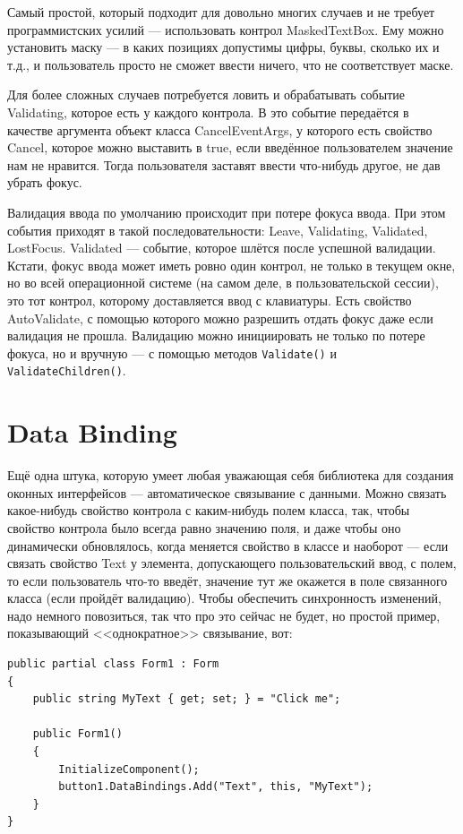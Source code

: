 \documentclass{../../text-style}
\begin{document}
Самый простой, который подходит для  довольно многих случаев и не требует программистских усилий --- использовать контрол MaskedTextBox. Ему можно установить маску --- в каких позициях допустимы цифры, буквы, сколько их  и т.д., и пользователь просто не сможет ввести ничего, что не соответствует маске.

Для более сложных случаев потребуется ловить и обрабатывать событие Validating, которое есть у каждого контрола. В это событие передаётся в качестве аргумента объект класса CancelEventArgs, у которого есть свойство Cancel, которое можно выставить в true, если введённое пользователем значение нам не нравится. Тогда пользователя заставят ввести что-нибудь другое, не дав убрать фокус.

Валидация ввода по умолчанию происходит при потере фокуса ввода. При этом события приходят в такой последовательности:  Leave, Validating, Validated, LostFocus. Validated --- событие, которое шлётся после успешной валидации. Кстати, фокус ввода может иметь ровно один контрол, не только в текущем окне, но во всей операционной системе (на самом деле, в пользовательской сессии), это тот контрол, которому доставляется ввод с клавиатуры. Есть свойство AutoValidate, с помощью которого можно разрешить отдать фокус даже если валидация не прошла. Валидацию можно инициировать не только по потере фокуса, но и вручную --- с помощью методов \texttt{Validate()} и \texttt{ValidateChildren()}.

\section{Data Binding}

Ещё одна штука, которую умеет любая уважающая себя библиотека для создания оконных интерфейсов --- автоматическое связывание с данными. Можно связать какое-нибудь свойство контрола с каким-нибудь полем класса, так, чтобы свойство контрола было всегда равно значению поля, и даже чтобы оно динамически обновлялось, когда меняется свойство в классе и наоборот --- если связать свойство Text у элемента, допускающего пользовательский ввод, с полем, то если пользователь что-то введёт, значение тут же окажется в поле связанного класса (если пройдёт валидацию). Чтобы обеспечить синхронность изменений, надо немного повозиться, так что про это сейчас не будет, но простой пример, показывающий <<однократное>> связывание, вот:

\begin{verbatim}
public partial class Form1 : Form
{
    public string MyText { get; set; } = "Click me";

    public Form1()
    {
        InitializeComponent();
        button1.DataBindings.Add("Text", this, "MyText");
    }
}
\end{verbatim}
\end{document}
